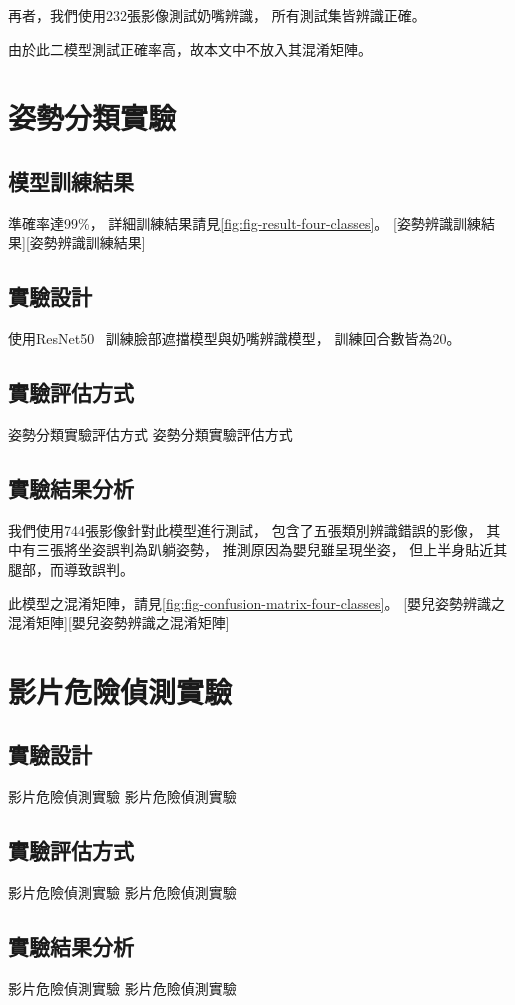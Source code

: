 \documentclass[class=NCU_thesis, crop=false]{standalone}
\begin{document}
再者，我們使用232張影像測試奶嘴辨識，
所有測試集皆辨識正確。

由於此二模型測試正確率高，故本文中不放入其混淆矩陣。

\section{姿勢分類實驗}
\subsection{模型訓練結果}
準確率達99\%，
詳細訓練結果請見\cref{fig:fig-result-four-classes}。
[姿勢辨識訓練結果][姿勢辨識訓練結果]

\subsection{實驗設計}
使用ResNet50~\cite{he_deep_2016}
訓練臉部遮擋模型與奶嘴辨識模型，
訓練回合數皆為20。

\subsection{實驗評估方式}
姿勢分類實驗評估方式 姿勢分類實驗評估方式

\subsection{實驗結果分析}
我們使用744張影像針對此模型進行測試，
包含了五張類別辨識錯誤的影像，
其中有三張將坐姿誤判為趴躺姿勢，
推測原因為嬰兒雖呈現坐姿，
但上半身貼近其腿部，而導致誤判。

此模型之混淆矩陣，請見\cref{fig:fig-confusion-matrix-four-classes}。
[嬰兒姿勢辨識之混淆矩陣][嬰兒姿勢辨識之混淆矩陣]

\section{影片危險偵測實驗}
\subsection{實驗設計}
影片危險偵測實驗 影片危險偵測實驗

\subsection{實驗評估方式}
影片危險偵測實驗 影片危險偵測實驗

\subsection{實驗結果分析}
影片危險偵測實驗 影片危險偵測實驗
\end{document}
